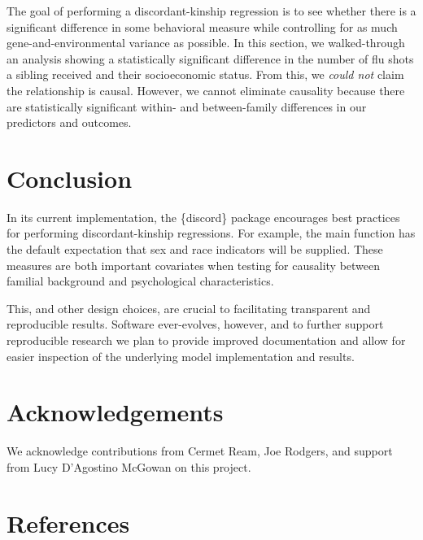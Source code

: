 \documentclass[10pt,a4paper,onecolumn]{article}
\begin{document}
The goal of performing a discordant-kinship regression is to see whether
there is a significant difference in some behavioral measure while
controlling for as much gene-and-environmental variance as possible. In
this section, we walked-through an analysis showing a statistically
significant difference in the number of flu shots a sibling received and
their socioeconomic status. From this, we \emph{could not} claim the
relationship is causal. However, we cannot eliminate causality because
there are statistically significant within- and between-family
differences in our predictors and outcomes.

\hypertarget{conclusion}{%
\section{Conclusion}\label{conclusion}}

In its current implementation, the \{discord\} package encourages best
practices for performing discordant-kinship regressions. For example,
the main function has the default expectation that sex and race
indicators will be supplied. These measures are both important
covariates when testing for causality between familial background and
psychological characteristics.

This, and other design choices, are crucial to facilitating transparent
and reproducible results. Software ever-evolves, however, and to further
support reproducible research we plan to provide improved documentation
and allow for easier inspection of the underlying model implementation
and results.

\hypertarget{acknowledgements}{%
\section{Acknowledgements}\label{acknowledgements}}

We acknowledge contributions from Cermet Ream, Joe Rodgers, and support
from Lucy D'Agostino McGowan on this project.

\hypertarget{references}{%
\section*{References}\label{references}}
\end{document}
